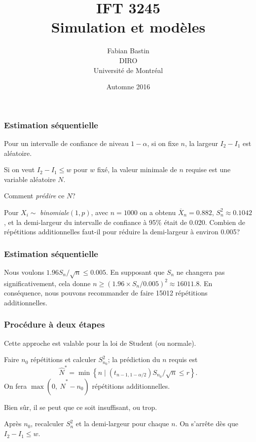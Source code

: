 \documentclass[t,usepdftitle=false]{beamer}
\title[IFT3245]{IFT 3245\\Simulation et modèles}
\author[Fabian Bastin]{Fabian Bastin\\DIRO\\Université de Montréal}
\date{Automne 2016}
\begin{document}
\frame{\titlepage}

\begin{frame}
\frametitle{Estimation séquentielle}

Pour un intervalle de confiance de niveau $1-{\alpha}$, si on fixe ${n}$, la largeur 
$I_2-I_1$ est aléatoire.

\mbox{}

Si on veut $I_2 - I_1 \le {w}$ pour $w$ fixé, la valeur minimale de $n$
requise est une variable aléatoire ${N}$.

\mbox{}

Comment \emph{prédire} ce $N$? 

\mbox{}

Pour $X_i \sim$ \emph{binomiale}$(1,{p})$, avec $n=1000$ on a obtenu 
$\overline{X}_n = 0.882$,  $S_n^2 \approx {0.1042}$, et la demi-largeur du
intervalle de confiance à 95\%{} était de 0.020.
Combien de répétitions additionnelles faut-il pour réduire
la demi-largeur à environ {0.005}?

\end{frame}

\begin{frame}
\frametitle{Estimation séquentielle}

Nous voulons $1.96 S_n/\sqrt{n} \le 0.005$.
En supposant que $S_n$ ne changera pas significativement, cela donne
$n \ge (1.96\times S_n / 0.005)^2 \approx 16011.8$.
En conséquence, nous pouvons recommander de faire 15012 répétitions
additionnelles.

\end{frame}

\begin{frame}
\frametitle{Procédure à deux étapes}

Cette approche est valable pour la loi de Student (ou normale).

\mbox{}

Faire ${n_0}$ répétitions et calculer $S^2_{n_0}$;
la prédiction du $n$ requis est 
\[
  {\hat{N}^*} 
  = \min\left\{n \mid (t_{n-1,1-\alpha/2}) S_{n_0}/\sqrt{n}\le r\right\}.
\]
On fera $\max(0,\ \hat{N}^*-n_0)$ répétitions additionnelles.

\mbox{}

Bien sûr, il se peut que ce soit insuffisant, ou trop.

\mbox{}

Après $n_0$, recalculer $S_n^2$ et la demi-largeur pour chaque $n$.
On s'arrête dès que $I_2 - I_1 \le w$.

\end{frame}
\end{document}
